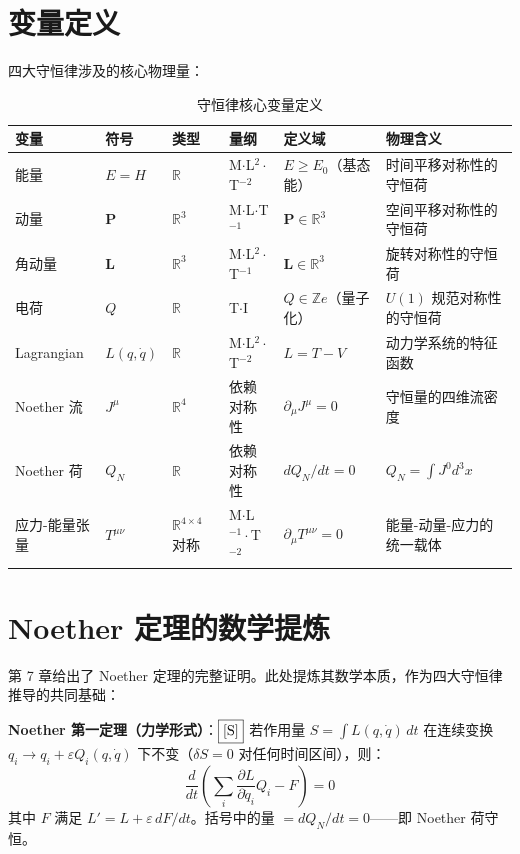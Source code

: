 \section{变量定义}

四大守恒律涉及的核心物理量：

\begin{table}[h]
\centering
\small
\begin{tabular}{p{2.5cm}p{2cm}p{2.5cm}p{1.8cm}p{2.5cm}p{3.5cm}}
\toprule
\textbf{变量} & \textbf{符号} & \textbf{类型} & \textbf{量纲} & \textbf{定义域} & \textbf{物理含义} \\
\midrule
能量 & $E = H$ & $\mathbb{R}$ & M$\cdot$L$^2\cdot$T$^{-2}$ & $E \ge E_0$（基态能）& 时间平移对称性的守恒荷 \\
动量 & $\mathbf{P}$ & $\mathbb{R}^3$ & M$\cdot$L$\cdot$T$^{-1}$ & $\mathbf{P} \in \mathbb{R}^3$ & 空间平移对称性的守恒荷 \\
角动量 & $\mathbf{L}$ & $\mathbb{R}^3$ & M$\cdot$L$^2\cdot$T$^{-1}$ & $\mathbf{L} \in \mathbb{R}^3$ & 旋转对称性的守恒荷 \\
电荷 & $Q$ & $\mathbb{R}$ & T$\cdot$I & $Q \in \mathbb{Z}e$（量子化）& $U(1)$ 规范对称性的守恒荷 \\
Lagrangian & $L(q,\dot{q})$ & $\mathbb{R}$ & M$\cdot$L$^2\cdot$T$^{-2}$ & $L = T-V$ & 动力学系统的特征函数 \\
Noether 流 & $J^\mu$ & $\mathbb{R}^4$ & 依赖对称性 & $\partial_\mu J^\mu = 0$ & 守恒量的四维流密度 \\
Noether 荷 & $Q_N$ & $\mathbb{R}$ & 依赖对称性 & $dQ_N/dt = 0$ & $Q_N = \int J^0 d^3x$ \\
应力-能量张量 & $T^{\mu\nu}$ & $\mathbb{R}^{4\times4}$ 对称 & M$\cdot$L$^{-1}\cdot$T$^{-2}$ & $\partial_\mu T^{\mu\nu}=0$ & 能量-动量-应力的统一载体 \\
\bottomrule
\end{tabular}
\caption{守恒律核心变量定义}
\end{table}

\section{Noether 定理的数学提炼}

第 7 章给出了 Noether 定理的完整证明。此处提炼其数学本质，作为四大守恒律推导的共同基础：

\textbf{Noether 第一定理（力学形式）}：$\fbox{[S]}$ 若作用量 $S = \int L(q,\dot{q})\,dt$ 在连续变换 $q_i \to q_i + \varepsilon Q_i(q,\dot{q})$ 下不变（$\delta S = 0$ 对任何时间区间），则：
\begin{equation}
\boxed{\frac{d}{dt}\!\left(\sum_i \frac{\partial L}{\partial\dot{q}_i}Q_i - F\right) = 0}
\end{equation}
其中 $F$ 满足 $L' = L + \varepsilon\,dF/dt$。括号中的量 $= dQ_N/dt = 0$——即 Noether 荷守恒。

